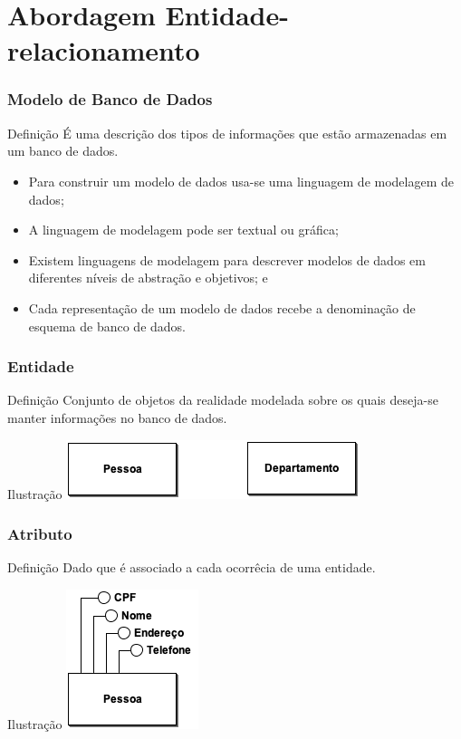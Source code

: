 \documentclass{beamer}
\begin{document}
\section{Abordagem Entidade-relacionamento}

\begin{frame}
\frametitle{Modelo de 	Banco de Dados}

\begin{block}{Definição}
	É uma descrição dos tipos de informações que estão armazenadas em um
	banco de dados.
\end{block} \vfill

\begin{itemize}
	\item Para construir um modelo de dados usa-se uma linguagem de
	modelagem de dados;
	\item A linguagem de modelagem pode ser textual ou gráfica;
	\item Existem linguagens de modelagem para descrever modelos de dados
	em diferentes níveis de abstração e objetivos; e
	\item Cada representação de um modelo de dados recebe a denominação de
	esquema de banco de dados.
\end{itemize}
\end{frame}

\begin{frame}
\frametitle{Entidade}

\begin{block}{Definição}
	Conjunto de objetos da realidade modelada sobre os quais deseja-se manter
	informações no banco de dados.
\end{block} \vfill

\begin{exampleblock}{Ilustração}
	\centering
	\includegraphics[scale=2.5]{img/entidades}
\end{exampleblock}
\end{frame}

\begin{frame}
\frametitle{Atributo}

\begin{block}{Definição}
	Dado que é associado a cada ocorrêcia de uma entidade.
\end{block} \vfill

\begin{exampleblock}{Ilustração}
	\centering
	\includegraphics[scale=2.5]{img/atributos}
\end{exampleblock}
\end{frame}
\end{document}
